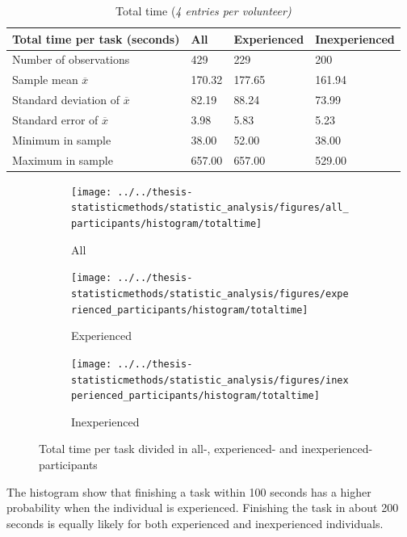 \begin{table}[H]
	\centering
	\begin{tabular}{l|l|l|l}
		Total time per task (seconds)   & All  & Experienced & Inexperienced \\ \hline
		Number of observations & 429    & 229    & 200   \\
		Sample mean $\overline{x}$     & 170.32 & 177.65  & 161.94     \\
		Standard deviation of $\overline{x}$  & 82.19  & 88.24  & 73.99   \\
		Standard error of $\overline{x}$  & 3.98  & 5.83 & 5.23  \\
		Minimum in sample & 38.00  & 52.00  & 38.00     \\
		Maximum in sample & 657.00 & 657.00  & 529.00    \\ \hline
	\end{tabular}
	\caption[All participants and all tasks]{Total time (\textit{4 entries per volunteer)}}
	\label{tab:totaltime_all}
\end{table}

\begin{figure}[H]
	\centering
	\begin{subfigure}[b]{0.32\textwidth}
		\centering
		\texttt{[image: ../../thesis-statisticmethods/statistic\_analysis/figures/all\_participants/histogram/totaltime]}
		\caption{All}
		\label{fig:totaltime_all}
	\end{subfigure}
	\begin{subfigure}[b]{0.32\textwidth}
		\centering
		\texttt{[image: ../../thesis-statisticmethods/statistic\_analysis/figures/experienced\_participants/histogram/totaltime]}
		\caption{Experienced}
		\label{fig:totaltime_experienced}
	\end{subfigure}
	\begin{subfigure}[b]{0.32\textwidth}
		\centering
		\texttt{[image: ../../thesis-statisticmethods/statistic\_analysis/figures/inexperienced\_participants/histogram/totaltime]}
		\caption{Inexperienced}
		\label{fig:totaltime_inexperienced}
	\end{subfigure}
	\caption[Total time, participants sorted]{Total time per task divided in  all-, experienced- and inexperienced-participants}
\end{figure}

The histogram show that finishing a task within 100 seconds has a higher probability when the individual is experienced. Finishing the task in about 200 seconds is equally likely for both experienced and inexperienced individuals. 


